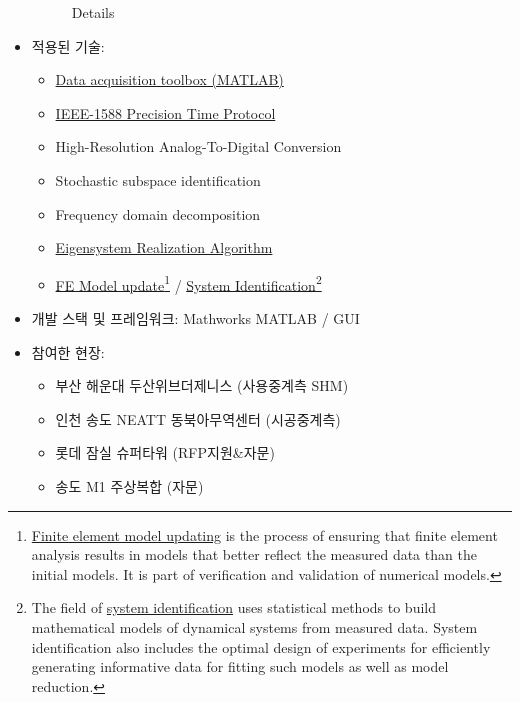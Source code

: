 \begin{itemize}
\begin{figure}[ht]
\begin{fullwidth}
{				      \caption*{Details}
			      }
		      \end{fullwidth}
	      \end{figure}
	\item 적용된 기술:
	      \begin{itemize}
		      \item \href{http://kr.mathworks.com/products/daq/}{Data acquisition toolbox (MATLAB)}
		      \item \href{https://ko.wikipedia.org/wiki/IEEE_1588}{IEEE-1588 Precision Time Protocol}
		      \item High-Resolution Analog-To-Digital Conversion
		      \item Stochastic subspace identification
		      \item Frequency domain decomposition
		      \item \href{https://en.wikipedia.org/wiki/Eigensystem_realization_algorithm}{Eigensystem Realization Algorithm}
		      \item \href{https://en.wikipedia.org/wiki/Finite_element_updating}{FE Model update}\footnote{\href{https://en.wikipedia.org/wiki/Finite_element_updating}{Finite element model updating} is the process of ensuring that finite element analysis results in models that better reflect the measured data than the initial models. It is part of verification and validation of numerical models.} / \href{https://en.wikipedia.org/wiki/System_identification}{System Identification}\footnote{The field of \href{https://en.wikipedia.org/wiki/System_identification}{system identification} uses statistical methods to build mathematical models of dynamical systems from measured data. System identification also includes the optimal design of experiments for efficiently generating informative data for fitting such models as well as model reduction.}
	      \end{itemize}
	\item 개발 스택 및 프레임워크: Mathworks MATLAB / GUI
	\item 참여한 현장:
	      \begin{itemize}
		      \item 부산 해운대 두산위브더제니스 (사용중계측 SHM)
		      \item 인천 송도 NEATT 동북아무역센터 (시공중계측)
		      \item 롯데 잠실 슈퍼타워 (RFP지원\&자문)
		      \item 송도 M1 주상복합 (자문)
	      \end{itemize}
\end{itemize}

